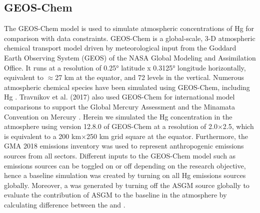 \subsection{GEOS-Chem}
\begin{flushleft}
The GEOS-Chem model \cite{bey_global_2001} is used to simulate atmospheric concentrations of Hg for comparison with data constraints. GEOS-Chem is a global-scale, 3-D atmospheric chemical transport model driven by meteorological input from the Goddard Earth Observing System (GEOS) of the NASA Global Modeling and Assimilation Office. It runs at a resolution of 0.25° latitude x 0.3125° longitude horizontally, equivalent to $\approx$27 km at the equator, and 72 levels in the vertical. Numerous atmospheric chemical species have been simulated using GEOS-Chem, including Hg \cite{amos_gas-particle_2012,holmes_global_2010,selin_chemical_2007,selin_global_2008,zhang_naturally-derived_2016}. Travnikov et al. (2017) also used GEOS-Chem for international model comparisons to support the Global Mercury Assessment and the Minamata Convention on Mercury \cite{travnikov_multi-model_2017}.
Herein we simulated the Hg concentration in the atmosphere using version 12.8.0 of GEOS-Chem at a resolution of 2.0$\times$2.5, which is equivalent to a 200 km$\times$250 km grid square at the equator. Furthermore, the GMA 2018 emissions inventory was used to represent anthropogenic emissions sources from all sectors. Different inputs to the GEOS-Chem model such as emissions sources can be toggled on or off depending on the research objective, hence a baseline simulation was created by turning on all Hg emissions sources globally. Moreover, a \off was generated by turning off the ASGM source globally to evaluate the contribution of ASGM to the baseline \hg in the atmosphere by calculating difference between the \on and \off.
\end{flushleft}

\begin{table}[H]
\label{tab:geos_chem_simulation_description}

\centering
{}

\end{table}

